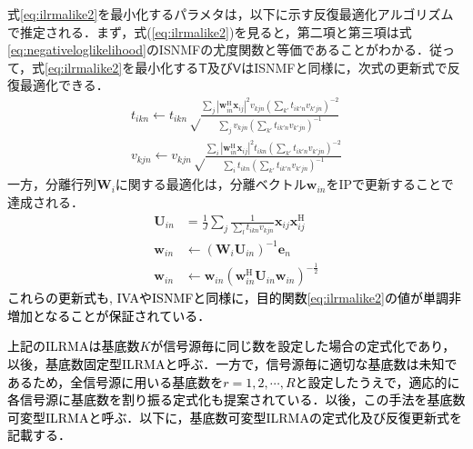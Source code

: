 式\eqref{eq:ilrmalike2}を最小化するパラメタは，以下に示す反復最適化アルゴリズムで推定される．まず，式(\ref{eq:ilrmalike2})を見ると，第二項と第三項は式\eqref{eq:negativeloglikelihood}のISNMFの尤度関数と等価であることがわかる．従って，式\eqref{eq:ilrmalike2}を最小化する$\mathsf{T}$及び$\mathsf{V}$はISNMFと同様に，次式の更新式で反復最適化できる．
\begin{align}
    t_{ikn} \leftarrow t_{ikn} \sqrt \frac{ \sum_j |\bm{w}_{in}^{\mathrm{H}}\bm{x}_{ij}|^2 v_{kjn} \left( \sum_{k'} t_{ik'n} v_{k'jn} \right)^{-2} }{ \sum_j v_{kjn} \left( \sum_{k'} t_{ik'n} v_{k'jn} \right)^{-1} } \label{eq:MUTilrma} \\
    v_{kjn} \leftarrow v_{kjn} \sqrt \frac{ \sum_i |\bm{w}_{in}^{\mathrm{H}}\bm{x}_{ij}|^2 t_{ikn} \left( \sum_{k'} t_{ik'n} v_{k'jn} \right)^{-2} }{ \sum_i t_{ikn} \left( \sum_{k'} t_{ik'n} v_{k'jn} \right)^{-1} } \label{eq:MUVilrma}
\end{align}
一方，分離行列$\bm{W}_i$に関する最適化は，分離ベクトル$\bm{w}_{in}$をIPで更新することで達成される．
\begin{align}
\bm{U}_{in} &= \frac{1}{J} \sum_j \frac{1}{\sum_{l}t_{ikn}v_{kjn}} \bm{x}_{ij} \bm{x}_{ij}^{\mathrm{H}} \label{eq:ip1} \\
\bm{w}_{in} &\leftarrow (\bm{W}_i \bm{U}_{in})^{-1} \bm{e}_n \label{eq:ip2} \\
\bm{w}_{in} &\leftarrow \bm{w}_{in} ( \bm{w}_{in}^{\mathrm{H}} \bm{U}_{in} \bm{w}_{in} )^{-\frac{1}{2}} \label{eq:ip3}
\end{align}
\textcolor{black}{これらの更新式も, IVAやISNMFと同様に，目的関数\eqref{eq:ilrmalike2}の値が単調非増加となることが保証されている．}

\textcolor{black}{上記のILRMAは基底数$K$が信号源毎に同じ数を設定した場合の定式化であり，以後，基底数固定型ILRMAと呼ぶ．一方で，信号源毎に適切な基底数は未知であるため，全信号源に用いる基底数を$r=1, 2, \cdots, R$と設定したうえで，適応的に各信号源に基底数を割り振る定式化も提案されている．以後，この手法を基底数可変型ILRMAと呼ぶ．以下に，基底数可変型ILRMAの定式化及び反復更新式を記載する．}

